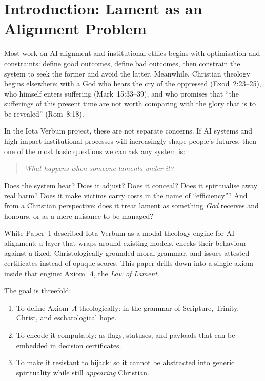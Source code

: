 \documentclass[11pt]{article}
\begin{document}
\tableofcontents

\section{Introduction: Lament as an Alignment Problem}

Most work on AI alignment and institutional ethics begins with optimisation and constraints: define good outcomes, define bad outcomes, then constrain the system to seek the former and avoid the latter. Meanwhile, Christian theology begins elsewhere: with a God who hears the cry of the oppressed (Exod~2:23--25), who himself enters suffering (Mark~15:33--39), and who promises that ``the sufferings of this present time are not worth comparing with the glory that is to be revealed'' (Rom~8:18).

In the Iota Verbum project, these are not separate concerns. If AI systems and high-impact institutional processes will increasingly shape people's futures, then one of the most basic questions we can ask any system is:

\begin{quote}
  \emph{What happens when someone laments under it?}
\end{quote}

Does the system hear? Does it adjust? Does it conceal? Does it spiritualise away real harm? Does it make victims carry costs in the name of ``efficiency''? And from a Christian perspective: does it treat lament as something \emph{God} receives and honours, or as a mere nuisance to be managed?

White Paper~1 described Iota Verbum as a modal theology engine for AI alignment: a layer that wraps around existing models, checks their behaviour against a fixed, Christologically grounded moral grammar, and issues attested certificates instead of opaque scores. This paper drills down into a single axiom inside that engine: Axiom~$\Lambda$, the \emph{Law of Lament}.

The goal is threefold:
\begin{enumerate}[label=(\alph*)]
  \item To define Axiom~$\Lambda$ theologically: in the grammar of Scripture, Trinity, Christ, and eschatological hope.
  \item To encode it computably: as flags, statuses, and payloads that can be embedded in decision certificates.
  \item To make it resistant to hijack: so it cannot be abstracted into generic spirituality while still \emph{appearing} Christian.
\end{enumerate}
\end{document}
